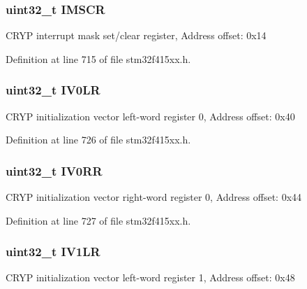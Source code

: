 \subsubsection[{\texorpdfstring{I\+M\+S\+CR}{IMSCR}}]{ uint32\+\_\+t I\+M\+S\+CR}\hypertarget{struct_c_r_y_p___type_def_adcdd7c23a99f81c21dae2e9f989632e1}{}\label{struct_c_r_y_p___type_def_adcdd7c23a99f81c21dae2e9f989632e1}
C\+R\+YP interrupt mask set/clear register, Address offset\+: 0x14 

Definition at line 715 of file stm32f415xx.\+h.

\subsubsection[{\texorpdfstring{I\+V0\+LR}{IV0LR}}]{ uint32\+\_\+t I\+V0\+LR}\hypertarget{struct_c_r_y_p___type_def_ab1efba4cdf22c525fce804375961d567}{}\label{struct_c_r_y_p___type_def_ab1efba4cdf22c525fce804375961d567}
C\+R\+YP initialization vector left-\/word register 0, Address offset\+: 0x40 

Definition at line 726 of file stm32f415xx.\+h.

\subsubsection[{\texorpdfstring{I\+V0\+RR}{IV0RR}}]{ uint32\+\_\+t I\+V0\+RR}\hypertarget{struct_c_r_y_p___type_def_aeb1990f7c28e815a4962db3a861937bb}{}\label{struct_c_r_y_p___type_def_aeb1990f7c28e815a4962db3a861937bb}
C\+R\+YP initialization vector right-\/word register 0, Address offset\+: 0x44 

Definition at line 727 of file stm32f415xx.\+h.

\subsubsection[{\texorpdfstring{I\+V1\+LR}{IV1LR}}]{ uint32\+\_\+t I\+V1\+LR}\hypertarget{struct_c_r_y_p___type_def_aad2f43335b25a0065f3d327364610cbd}{}\label{struct_c_r_y_p___type_def_aad2f43335b25a0065f3d327364610cbd}
C\+R\+YP initialization vector left-\/word register 1, Address offset\+: 0x48 

